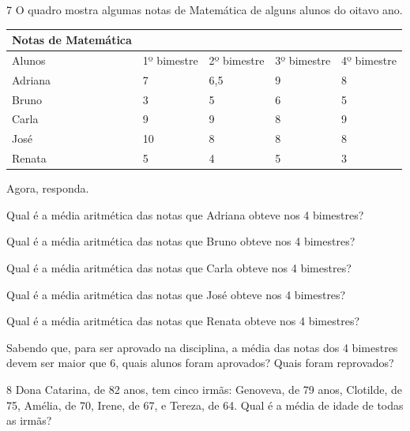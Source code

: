 {{{


\num{7} O quadro mostra algumas notas de Matemática de alguns alunos do oitavo ano.


\begin{longtable}[]{@{}lllll@{}}
\toprule
Notas de Matemática & & & &\tabularnewline
\midrule
\endhead
Alunos & 1º bimestre & 2º bimestre & 3º bimestre & 4º bimestre\tabularnewline
Adriana & 7 & 6,5 & 9 & 8\tabularnewline
Bruno & 3 & 5 & 6 & 5\tabularnewline
Carla & 9 & 9 & 8 & 9\tabularnewline
José & 10 & 8 & 8 & 8\tabularnewline
Renata & 5 & 4 & 5 & 3\tabularnewline
\bottomrule
\end{longtable}

Agora, responda.

\begin{escolha}
\item Qual é a média aritmética das notas que Adriana obteve nos 4
bimestres?

\item Qual é a média aritmética das notas que Bruno obteve nos 4 bimestres?

\item Qual é a média aritmética das notas que Carla obteve nos 4 bimestres?

\item Qual é a média aritmética das notas que José obteve nos 4 bimestres?

\item Qual é a média aritmética das notas que Renata obteve nos 4
bimestres?

\item Sabendo que, para ser aprovado na disciplina, a média das notas dos 4
bimestres devem ser maior que 6, quais alunos foram aprovados? Quais
foram reprovados?

\end{escolha}








\num{8} Dona Catarina, de 82 anos, tem cinco irmãs: Genoveva, de 79 anos,
Clotilde, de 75, Amélia, de 70, Irene, de 67, e Tereza, de 64. Qual é a
média de idade de todas as irmãs?

}}}

